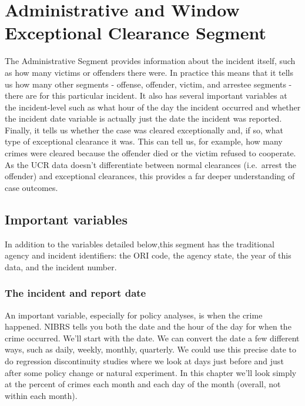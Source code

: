 \documentclass[
  12pt,
  openany]{book}
\begin{document}
\hypertarget{administrative-and-window-exceptional-clearance-segment}{%
\chapter{Administrative and Window Exceptional Clearance Segment}\label{administrative-and-window-exceptional-clearance-segment}}

The Administrative Segment provides information about the incident itself, such as how many victims or offenders there were. In practice this means that it tells us how many other segments - offense, offender, victim, and arrestee segments - there are for this particular incident. It also has several important variables at the incident-level such as what hour of the day the incident occurred and whether the incident date variable is actually just the date the incident was reported. Finally, it tells us whether the case was cleared exceptionally and, if so, what type of exceptional clearance it was. This can tell us, for example, how many crimes were cleared because the offender died or the victim refused to cooperate. As the UCR data doesn't differentiate between normal clearances (i.e.~arrest the offender) and exceptional clearances, this provides a far deeper understanding of case outcomes.

\hypertarget{important-variables}{%
\section{Important variables}\label{important-variables}}

In addition to the variables detailed below,this segment has the traditional agency and incident identifiers: the ORI code, the agency state, the year of this data, and the incident number.

\hypertarget{the-incident-and-report-date}{%
\subsection{The incident and report date}\label{the-incident-and-report-date}}

An important variable, especially for policy analyses, is when the crime happened. NIBRS tells you both the date and the hour of the day for when the crime occurred. We'll start with the date. We can convert the date a few different ways, such as daily, weekly, monthly, quarterly. We could use this precise date to do regression discontinuity studies where we look at days just before and just after some policy change or natural experiment. In this chapter we'll look simply at the percent of crimes each month and each day of the month (overall, not within each month).
\end{document}
